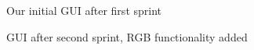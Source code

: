 \documentclass[11pt]{article} %
\begin{document}
  
  \begin{figure}[H]
  	\centering
  	\caption{Our initial GUI after first sprint}
  	\label{fig:GUI Design 1}
  \end{figure}
  
  \begin{figure}[H]
  	\centering
  	\caption{GUI after second sprint, RGB functionality added}
  	\label{fig:GUI Design 2}
  \end{figure}  
  
\end{document}
